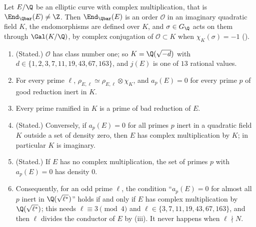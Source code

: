 \begin{theorem}\label{thm:ant:cm}
Let $E/\Q$ be an elliptic curve with complex multiplication, that is $\End_{\Qbar}(E)\ne\Z$. Then $\End_{\Qbar}(E)$ is an order $\mathcal O$ in an imaginary
quadratic field $K$, the endomorphisms are defined over $K$, and $\sigma\in G_\Q$ acts on them through $\Gal(K/\Q)$, by complex conjugation of
$\mathcal O\subset K$ when $\chi_K(\sigma)=-1$ ().
\begin{enumerate}[label=(\roman*)]
\item (Stated.) $\mathcal O$ has class number one; so $K=\Q(\sqrt{-d})$ with $d\in\{1,2,3,7,11,19,43,67,163\}$, and $j(E)$ is one of $13$ rational values.
\item For every prime $\ell$, $\rho_{E,\ell}\simeq\rho_{E,\ell}\otimes\chi_K$, and $a_p(E)=0$ for every prime $p$ of good reduction inert in $K$.
\item Every prime ramified in $K$ is a prime of bad reduction of $E$.
\item (Stated.) Conversely, if $a_p(E)=0$ for all primes $p$ inert in a quadratic field $K$ outside a set of density zero, then $E$ has complex multiplication by
$K$; in particular $K$ is imaginary.
\item (Stated.) If $E$ has no complex multiplication, the set of primes $p$ with $a_p(E)=0$ has density $0$.
\item Consequently, for an odd prime $\ell$, the condition ``$a_p(E)=0$ for almost all $p$ inert in $\Q(\sqrt{\ell^*})$'' holds if and only if $E$ has
complex multiplication by $\Q(\sqrt{\ell^*})$; this needs $\ell\equiv3\pmod4$ and $\ell\in\{3,7,11,19,43,67,163\}$, and then $\ell$ divides the conductor of $E$ by (iii). It never
happens when $\ell\nmid N$.
\end{enumerate}
\end{theorem}

